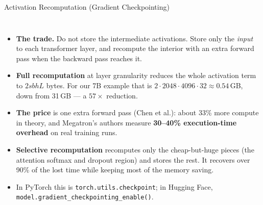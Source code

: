 \begin{frame}{Activation Recomputation (Gradient Checkpointing)}
  \begin{columns}[T,onlytextwidth]
      \begin{itemize}\footnotesize\itemsep0.35em
        \item[\textcolor{red}{$\blacktriangleright$}] \textbf{The trade.} Do not store the intermediate activations. Store only the \emph{input} to each transformer layer, and recompute the interior with an extra forward pass when the backward pass reaches it.
        \item[\textcolor{red}{$\blacktriangleright$}] \textbf{Full recomputation} at layer granularity reduces the whole activation term to $2 s b h L$ bytes. For our 7B example that is $2 \cdot 2048 \cdot 4096 \cdot 32 \approx 0.54$\,GB, down from 31\,GB --- a $57\times$ reduction.
        \item[\textcolor{red}{$\blacktriangleright$}] \textbf{The price} is one extra forward pass (Chen et al.): about 33\% more compute in theory, and Megatron's authors measure \textbf{30--40\% execution-time overhead} on real training runs.
        \item[\textcolor{red}{$\blacktriangleright$}] \textbf{Selective recomputation} recomputes only the cheap-but-huge pieces (the attention softmax and dropout region) and stores the rest. It recovers over 90\% of the lost time while keeping most of the memory saving.
        \item[\textcolor{red}{$\blacktriangleright$}] In PyTorch this is \texttt{torch.utils.checkpoint}; in Hugging Face, \texttt{model.gradient\_checkpointing\_enable()}.
      \end{itemize}
      \centering
      \vspace{0.6em}
\end{columns}
\end{frame}
